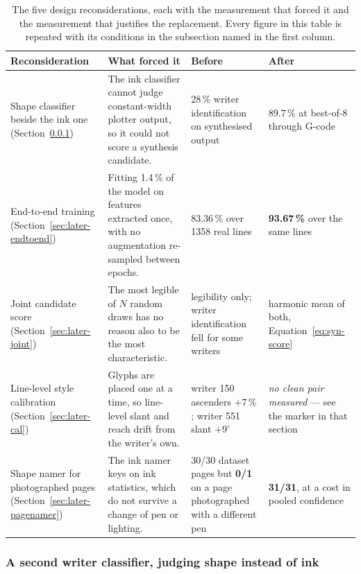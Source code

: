\begin{table}[!htbp]
\centering
\fontsize{8}{9.6}\selectfont
\setlength{\tabcolsep}{3.5pt}
\renewcommand{\arraystretch}{1.05}
\begin{tabularx}{\linewidth}{|p{2.5cm}|X|p{2.5cm}|p{2.5cm}|}
\hline
\textbf{Reconsideration} & \textbf{What forced it} & \textbf{Before} & \textbf{After} \\
\hline
Shape classifier beside the ink one (Section~\ref{sec:later-strokenorm}) &
The ink classifier cannot judge constant-width plotter output, so it could not score a synthesis candidate. &
28\,\% writer identification on synthesised output &
89.7\,\% at best-of-8 through G-code \\
\hline
End-to-end training (Section~\ref{sec:later-endtoend}) &
Fitting 1.4\,\% of the model on features extracted once, with no augmentation re-sampled between epochs. &
83.36\,\% over 1358 real lines &
\textbf{93.67\,\%} over the same lines \\
\hline
Joint candidate score (Section~\ref{sec:later-joint}) &
The most legible of $N$ random draws has no reason also to be the most characteristic. &
legibility only; writer identification fell for some writers &
harmonic mean of both, Equation~\ref{eq:syn-score} \\
\hline
Line-level style calibration (Section~\ref{sec:later-cal}) &
Glyphs are placed one at a time, so line-level slant and reach drift from the writer's own. &
writer 150 ascenders $+7\,\%$; writer 551 slant $+9^\circ$ &
\emph{no clean pair measured} --- see the marker in that section \\
\hline
Shape namer for photographed pages (Section~\ref{sec:later-pagenamer}) &
The ink namer keys on ink statistics, which do not survive a change of pen or lighting. &
30/30 dataset pages but \textbf{0/1} on a page photographed with a different pen &
\textbf{31/31}, at a cost in pooled confidence \\
\hline
\end{tabularx}
\caption{The five design reconsiderations, each with the measurement that forced it and the measurement that justifies the replacement. Every figure in this table is repeated with its conditions in the subsection named in the first column.}
\label{tab:later-summary}
\end{table}

\subsubsection{A second writer classifier, judging shape instead of ink}
\label{sec:later-strokenorm}

